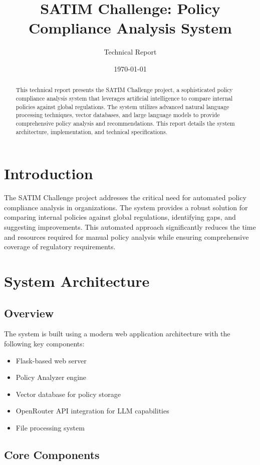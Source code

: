 \documentclass[11pt,a4paper]{article}
\title{SATIM Challenge: Policy Compliance Analysis System}
\author{Technical Report}
\date{\today}
\begin{document}
\maketitle

\begin{abstract}
This technical report presents the SATIM Challenge project, a sophisticated policy compliance analysis system that leverages artificial intelligence to compare internal policies against global regulations. The system utilizes advanced natural language processing techniques, vector databases, and large language models to provide comprehensive policy analysis and recommendations. This report details the system architecture, implementation, and technical specifications.
\end{abstract}

\section{Introduction}
The SATIM Challenge project addresses the critical need for automated policy compliance analysis in organizations. The system provides a robust solution for comparing internal policies against global regulations, identifying gaps, and suggesting improvements. This automated approach significantly reduces the time and resources required for manual policy analysis while ensuring comprehensive coverage of regulatory requirements.

\section{System Architecture}
\subsection{Overview}
The system is built using a modern web application architecture with the following key components:
\begin{itemize}
    \item Flask-based web server
    \item Policy Analyzer engine
    \item Vector database for policy storage
    \item OpenRouter API integration for LLM capabilities
    \item File processing system
\end{itemize}

\subsection{Core Components}
\end{document}
